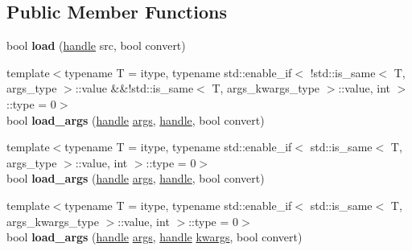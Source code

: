 \subsection*{Public Member Functions}
\begin{DoxyCompactItemize}
\item 
bool {\bfseries load} (\hyperlink{classhandle}{handle} src, bool convert)\hypertarget{classtype__caster_3_01std_1_1tuple_3_01_tuple_8_8_8_01_4_01_4_a4a072d89342fbe9cf966245ff37b82da}{}\label{classtype__caster_3_01std_1_1tuple_3_01_tuple_8_8_8_01_4_01_4_a4a072d89342fbe9cf966245ff37b82da}

\item 
{\footnotesize template$<$typename T  = itype, typename std\+::enable\+\_\+if$<$ !std\+::is\+\_\+same$<$ T, args\+\_\+type $>$\+::value \&\&!std\+::is\+\_\+same$<$ T, args\+\_\+kwargs\+\_\+type $>$\+::value, int $>$\+::type  = 0$>$ }\\bool {\bfseries load\+\_\+args} (\hyperlink{classhandle}{handle} \hyperlink{classargs}{args}, \hyperlink{classhandle}{handle}, bool convert)\hypertarget{classtype__caster_3_01std_1_1tuple_3_01_tuple_8_8_8_01_4_01_4_ab55d3a132100d7231976e766e393be20}{}\label{classtype__caster_3_01std_1_1tuple_3_01_tuple_8_8_8_01_4_01_4_ab55d3a132100d7231976e766e393be20}

\item 
{\footnotesize template$<$typename T  = itype, typename std\+::enable\+\_\+if$<$ std\+::is\+\_\+same$<$ T, args\+\_\+type $>$\+::value, int $>$\+::type  = 0$>$ }\\bool {\bfseries load\+\_\+args} (\hyperlink{classhandle}{handle} \hyperlink{classargs}{args}, \hyperlink{classhandle}{handle}, bool convert)\hypertarget{classtype__caster_3_01std_1_1tuple_3_01_tuple_8_8_8_01_4_01_4_ab55d3a132100d7231976e766e393be20}{}\label{classtype__caster_3_01std_1_1tuple_3_01_tuple_8_8_8_01_4_01_4_ab55d3a132100d7231976e766e393be20}

\item 
{\footnotesize template$<$typename T  = itype, typename std\+::enable\+\_\+if$<$ std\+::is\+\_\+same$<$ T, args\+\_\+kwargs\+\_\+type $>$\+::value, int $>$\+::type  = 0$>$ }\\bool {\bfseries load\+\_\+args} (\hyperlink{classhandle}{handle} \hyperlink{classargs}{args}, \hyperlink{classhandle}{handle} \hyperlink{classkwargs}{kwargs}, bool convert)\hypertarget{classtype__caster_3_01std_1_1tuple_3_01_tuple_8_8_8_01_4_01_4_a0c9081878e7de5b14b3d2b1753550c23}{}\label{classtype__caster_3_01std_1_1tuple_3_01_tuple_8_8_8_01_4_01_4_a0c9081878e7de5b14b3d2b1753550c23}


\end{DoxyCompactItemize}
